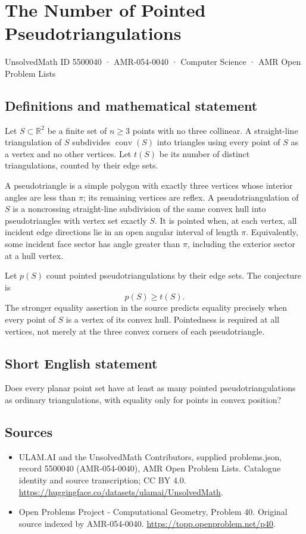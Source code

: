 \documentclass[11pt,a4paper]{article}
\begin{document}
\section*{The Number of Pointed Pseudotriangulations}\label{5500040}
{\small UnsolvedMath ID 5500040 · AMR-054-0040 · Computer Science · AMR Open Problem Lists}
\subsection{Definitions and mathematical statement}
Let $S\subset\mathbb R^2$ be a finite set of $n\ge3$ points with no
three collinear. A straight-line triangulation of $S$ subdivides
$\operatorname{conv}(S)$ into triangles using every point of $S$ as
a vertex and no other vertices. Let $t(S)$ be its number of distinct
triangulations, counted by their edge sets.

A pseudotriangle is a simple polygon with exactly three vertices
whose interior angles are less than $\pi$; its remaining vertices
are reflex. A pseudotriangulation of $S$ is a noncrossing straight-line
subdivision of the same convex hull into pseudotriangles with vertex
set exactly $S$. It is pointed when, at each vertex, all incident
edge directions lie in an open angular interval of length $\pi$.
Equivalently, some incident face sector has angle greater than $\pi$,
including the exterior sector at a hull vertex.

Let $p(S)$ count pointed pseudotriangulations by their edge sets.
The conjecture is
\[
                            p(S)\ge t(S).
\]
The stronger equality assertion in the source predicts equality
precisely when every point of $S$ is a vertex of its convex hull.
Pointedness is required at all vertices, not merely at the three
convex corners of each pseudotriangle.
\subsection{Short English statement}
Does every planar point set have at least as many pointed
pseudotriangulations as ordinary triangulations, with equality only
for points in convex position?
\subsection{Sources}
\begin{itemize}
\item[S1] ULAM.AI and the UnsolvedMath Contributors, supplied problems.json, record 5500040 (AMR-054-0040), AMR Open Problem Lists. Catalogue identity and source transcription; CC BY 4.0.
\url{https://huggingface.co/datasets/ulamai/UnsolvedMath}.
\item[S2] Open Problems Project - Computational Geometry, Problem 40. Original source indexed by AMR-054-0040.
\url{https://topp.openproblem.net/p40}.
\end{itemize}
\end{document}
